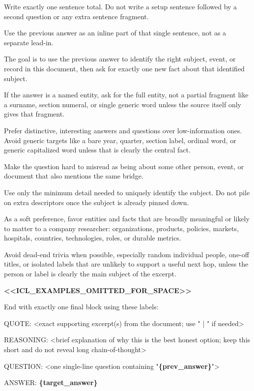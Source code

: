 \begin{tcolorbox}
\begin{scriptsize}
Write exactly one sentence total. Do not write a setup sentence followed by a second question or any extra sentence fragment.\par
Use the previous answer as an inline part of that single sentence, not as a separate lead-in.\par
The goal is to use the previous answer to identify the right subject, event, or record in this document, then ask for exactly one new fact about that identified subject.\par
If the answer is a named entity, ask for the full entity, not a partial fragment like a surname, section numeral, or single generic word unless the source itself only gives that fragment.\par
Prefer distinctive, interesting answers and questions over low-information ones. Avoid generic targets like a bare year, quarter, section label, ordinal word, or generic capitalized word unless that is clearly the central fact.\par
Make the question hard to misread as being about some other person, event, or document that also mentions the same bridge.\par
Use only the minimum detail needed to uniquely identify the subject. Do not pile on extra descriptors once the subject is already pinned down.\par
As a soft preference, favor entities and facts that are broadly meaningful or likely to matter to a company researcher: organizations, products, policies, markets, hospitals, countries, technologies, roles, or durable metrics.\par
Avoid dead-end trivia when possible, especially random individual people, one-off titles, or isolated labels that are unlikely to support a useful next hop, unless the person or label is clearly the main subject of the excerpt.\par
\mbox{}\par
\textcolor{my-green}{\textbf{\textless{}\textless{}ICL\_EXAMPLES\_OMITTED\_FOR\_SPACE\textgreater{}\textgreater{}}}\par
\mbox{}\par
End with exactly one final block using these labels:\par
QUOTE: \textless{}exact supporting excerpt(s) from the document; use " | " if needed\textgreater{}\par
REASONING: \textless{}brief explanation of why this is the best honest option; keep this short and do not reveal long chain-of-thought\textgreater{}\par
QUESTION: \textless{}one single-line question containing "\textcolor{my-green}{\textbf{\{prev\_answer\}}}"\textgreater{}\par
ANSWER: \textcolor{my-green}{\textbf{\{target\_answer\}}}\par
\end{scriptsize}
\end{tcolorbox}

